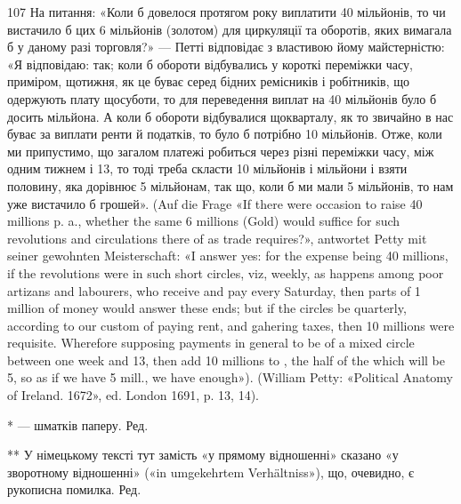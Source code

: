 107 На питання: «Коли б довелося протягом року виплатити 40 мільйонів,
то чи вистачило б цих 6 мільйонів (золотом) для циркуляції та оборотів,
яких вимагала б у даному разі торговля?» — Петті відповідає з
властивою йому майстерністю: «Я відповідаю: так; коли б обороти відбувались
у короткі переміжки часу, приміром, щотижня, як це буває
серед бідних ремісників і робітників, що одержують плату щосуботи, то
для переведення виплат на 40 мільйонів було б досить  мільйона.
А коли б обороти відбувалися щокварталу, як то звичайно в нас буває
за виплати ренти й податків, то було б потрібно 10 мільйонів. Отже, коли
ми припустимо, що загалом платежі робиться через різні переміжки часу,
між одним тижнем і 13, то тоді треба скласти 10 мільйонів і  мільйони
і взяти половину, яка дорівнює 5 мільйонам, так що, коли б ми мали
5 мільйонів, то нам уже вистачило б грошей». (Auf die Frage «If there were
occasion to raise 40 millions p. a., whether the same 6 millions (Gold) would
suffice for such revolutions and circulations there of as trade requires?», antwortet
Petty mit seiner gewohnten Meisterschaft: «I answer yes: for the expense
being 40 millions, if the revolutions were in such short circles, viz, weekly,
as happens among poor artizans and labourers, who receive and pay every
Saturday, then  parts of 1 million of money would answer these ends;
but if the circles be quarterly, according to our custom of paying rent, and
gahering taxes, then 10 millions were requisite. Wherefore supposing payments
in general to be of a mixed circle between one week and 13, then add
10 millions to , the half of the which will be 5, so as if we have
5 mill., we have enough»). (William Petty: «Political Anatomy of Ireland.
1672», ed. London 1691, p. 13, 14).

* — шматків паперу. Ред.

** У німецькому тексті тут замість «у прямому відношенні» сказано
«у зворотному відношенні» («in umgekehrtem Verhältniss»), що, очевидно,
є рукописна помилка. Ред.
